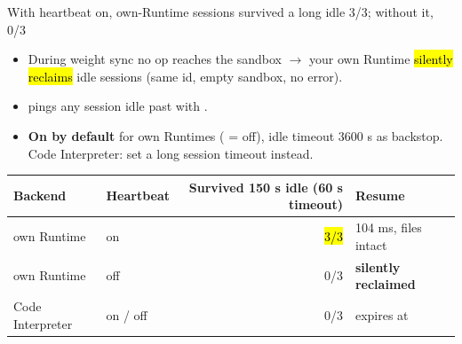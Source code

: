 \begin{frame}{With heartbeat on, own-Runtime sessions survived a long idle 3/3; without it, 0/3}
\begin{itemize}\footnotesize\setlength{\itemsep}{1mm}
\item During weight sync no op reaches the sandbox $\rightarrow$ your own Runtime \hl{silently reclaims} idle sessions (same id, empty sandbox, no error).
\item {} pings any session idle past  with .
\item \textbf{On by default} for own Runtimes ( = off), idle timeout 3600 s as backstop. Code Interpreter: set a long session timeout instead.
\end{itemize}
\vspace{2mm}
\footnotesize
\begin{tabularx}{\textwidth}{@{}l l r Y@{}}
\toprule
\textbf{Backend} & \textbf{Heartbeat} & \textbf{Survived 150 s idle (60 s timeout)} & \textbf{Resume}\\
\midrule
own Runtime & on & \hl{3/3} & 104 ms, files intact\\
own Runtime & off & 0/3 & \textbf{silently reclaimed}\\
Code Interpreter & on / off & 0/3 & expires at \\
\bottomrule
\end{tabularx}
\end{frame}

